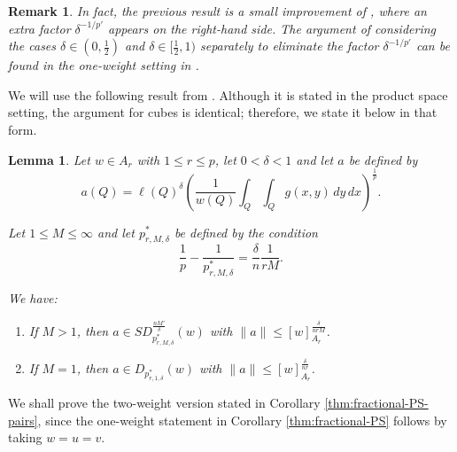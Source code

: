 \documentclass[reqno, 10pt, oneside]{amsart}
\numberwithin{equation}{section}
\newtheorem{lemma}[theorem]{Lemma}
\newtheorem{remark}[theorem]{Remark}
\numberwithin{theorem}{section}
\newcommand{\1}{{\rm 1\hspace*{-0.4ex}%
\rule{0.1ex}{1.52ex}\hspace*{0.2ex}}}
\begin{document}
\begin{remark}
In fact, the previous result is a small improvement of \cite[Corollary 5.2]{MPW}, where an extra factor $\delta^{-1/p'}$ appears on the right-hand side. The argument of considering the cases $\delta \in (0, \tfrac{1}{2})$ and $\delta \in [\tfrac{1}{2}, 1)$ separately to eliminate the factor $\delta^{-1/p'}$ can be found in the one-weight setting in \cite[p. 71]{ThesisIker}.
\end{remark}



We will use the following result from \cite{CMPR}. Although it is stated in the product space setting, the argument for cubes is identical; therefore, we state it below in that form.
  
 \begin{lemma}{\cite[Lemma 6.2]{CMPR}}{\label{CMPR Lemma}} 
 Let $w\in A_r$ with $1\le r\le  p$, let $0<\delta<1$ and let $a$ be defined by
 	 \begin{equation}\label{a2}
 		a(Q)=\ell(Q)^\delta \left( \frac{1}{w(Q)} \int_Q \int_Q g(x,y)\, dy \, dx \right)^\frac{1}{p}.
 	\end{equation}
 	
 	Let $1 \le M \le \infty$ and let $p^*_{r, M,\delta}$ be defined by the condition
 	\begin{equation}\label{p*M11}
		\frac{1}{p}-\frac{1}{p^*_{r, M,\delta}}=\frac{\delta}{n } \frac{1}{r M}.
	\end{equation}
 	
 	We have:
 	\begin{enumerate}
 		\item If $M>1$, then $a\in SD_{p^*_{r, M,\delta}}^{\frac{nM'}{\delta}}(w)$ with $\|a\|\le [w]_{A_r}^{\frac{\delta}{nr M}}$.
 		\item If $M=1$, then $a\in D_{p^*_{r, 1, \delta}}(w)$ with $\|a\|\le [w]_{A_r}^{\frac{\delta}{nr }}$.
 	\end{enumerate}
 \end{lemma}
 
 We shall prove the two-weight version stated in Corollary \ref{thm:fractional-PS-pairs}, since the one-weight statement in Corollary \ref{thm:fractional-PS} follows by taking $w=u=v$.
\end{document}
